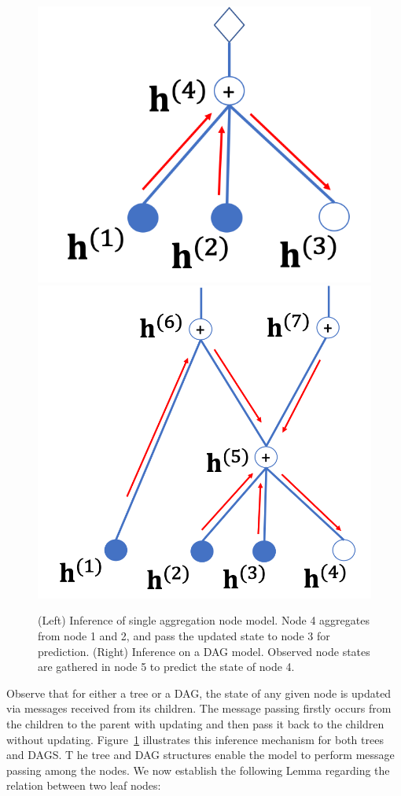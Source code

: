 \documentclass{article} %
\begin{document}
\begin{figure}
\vspace{-0.3in}
\begin{center}
 \includegraphics[width=0.4\linewidth]{fig/two_layer_infer.png}
 \hspace{0.15in}
 \includegraphics[width=0.5\linewidth]{fig/dag_infer.png}
\end{center}
\vspace{-0.2in}
 \caption{{\small (Left) Inference of single aggregation node model. Node 4 aggregates from node 1 and 2, and  pass the updated state to node 3 for prediction. (Right) Inference on a DAG model. Observed node states are gathered in node 5 to predict the state of node 4.}}
\label{fig:two_layer_infer}
\vspace{-0.1in}
\end{figure}
Observe that for either a tree or a DAG, the state of any given node is updated via messages received from its children. 
The message passing firstly occurs from the children to the parent with updating and then pass it back to the children without updating. 
Figure~\ref{fig:two_layer_infer} illustrates this inference mechanism for both trees and DAGS. T
he tree and DAG structures enable the model to perform message passing among the nodes.  
We now establish the following Lemma regarding the relation between two leaf nodes:
\end{document}
